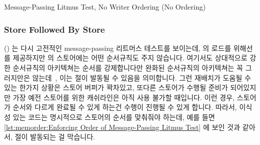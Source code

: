 \begin{listing}[tbp]

\caption{Message-Passing Litmus Test, No Writer Ordering (No Ordering)}
\label{lst:memorder:Message-Passing Litmus Test; No Writer Ordering (No Ordering)}
\end{listing}

\subsubsection{Store Followed By Store}
\label{sec:memorder:Store Followed By Store}

()
는 다시 고전적인 message-passing 리트머스 테스트를 보이는데,  의
로드를 위해선  를 제공하지만  의 스토어에는 어떤
순서규칙도 주지 않습니다.
여기서도 상대적으로 강한 순서규칙의 아키텍쳐는 순서를 강제합니다만 완화된
순서규칙의 아키텍쳐는 꼭 그러지만은 않는데~\cite{JadeAlglave2011ppcmem}, 이는
 절이 발동될 수 있음을 의미합니다.
그런 재배치가 도움될 수 있는 한가지 상황은 스토어 버퍼가 꽉차있고, 또다른
스토어가 수행될 준비가 되어있지만 가장 예전 스토어를 위한 캐쉬라인은 아직 사용
불가할 때입니다.
이런 경우, 스토어가 순서와 다르게 완료될 수 있게 하는건 수행이 진행될 수 있게
합니다.
따라서, 이식성 있는 코드는 명시적으로 스토어의 순서를 맞춰줘야 하는데, 예를
들면
\cref{lst:memorder:Enforcing Order of Message-Passing Litmus Test} 에 보인 것과
같아서,  절이 발동되는 걸 막습니다.

\iffalse

